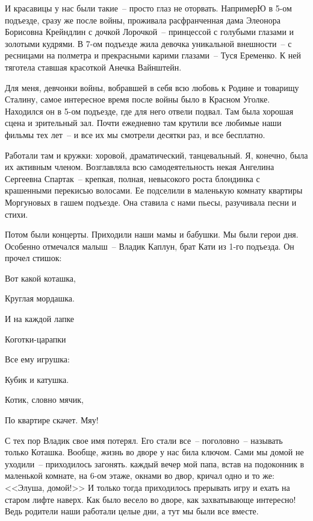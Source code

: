И красавицы у нас были такие~-- просто глаз не оторвать. НапримерЮ в 5-ом подъезде, сразу же после войны, проживала расфранченная дама Элеонора Борисовна Крейндлин с дочкой Лорочкой~-- принцессой с голубыми глазами и золотыми кудрями. В 7-ом подъезде жила девочка уникальной внешности~-- с ресницами на полметра и прекрасными карими глазами~-- Туся Еременко. К ней тяготела ставшая красоткой Анечка Вайнштейн.

Для меня, девчонки войны, вобравшей в себя всю любовь к Родине и товарищу Сталину, самое интересное время после войны было в Красном Уголке. Находился он в 5-ом подъезде, где для него отвели подвал. Там была хорошая сцена и зрительный зал. Почти ежедневно там крутили все любимые наши фильмы тех лет~-- и все их мы смотрели десятки раз, и все бесплатно.

Работали там и кружки: хоровой, драматический, танцевальный. Я, конечно, была их активным членом. Возглавляла всю самодеятельность некая Ангелина Сергеевна Спартак~-- крепкая, полная, невысокого роста блондинка с крашенными перекисью волосами. Ее подселили в маленькую комнату квартиры Моргуновых в гашем подъезде. Она ставила с нами пьесы, разучивала песни и стихи.

Потом были концерты. Приходили наши мамы и бабушки. Мы были герои дня. Особенно отмечался малыш~-- Владик Каплун, брат Кати из 1-го подъезда. Он прочел стишок:

\indent

{\itshape

    Вот какой коташка,
    
    Круглая мордашка.
    
    И на каждой лапке
    
    Коготки-царапки
    
    Все ему игрушка:
    
    Кубик и катушка.
    
    Котик, словно мячик,
    
    По квартире скачет. Мяу!
    
}

\indent

С тех пор Владик свое имя потерял. Его стали все~-- поголовно~-- называть только Коташка. Вообще, жизнь во дворе у нас била ключом. Сами мы домой не уходили~-- приходилось загонять. каждый вечер мой папа, встав на подоконник в маленькой комнате, на 6-ом этаже, окнами во двор, кричал одно и то же: <<Элуша, домой!>> И только тогда приходилось прерывать игру и ехать на старом лифте наверх. Как было весело во дворе, как захватывающе интересно! Ведь родители наши работали целые дни, а тут мы были все вместе.

